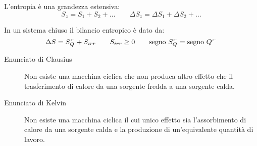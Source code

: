 L'entropia è una grandezza estensiva:
\[
    S_z = S_1 + S_2 + \ldots \qquad \Delta S_z = \Delta S_1 + \Delta S_2 + \ldots
\]

In un sistema chiuso il bilancio entropico è dato da:
\[
    \Delta S = S_Q^\shortleftarrow + S_{irr} \qquad S_{irr} \ge 0 \qquad \text{segno}~S_Q^\shortleftarrow = \text{segno}~Q^\shortleftarrow
\]

\begin{description}
    \item[Enunciato di Clausius]Non esiste una macchina ciclica che non produca altro effetto che il trasferimento di calore da una sorgente fredda a una sorgente calda.

\item[Enunciato di Kelvin]
Non esiste una macchina ciclica il cui unico effetto sia l'assorbimento di calore da una sorgente calda e la produzione di un'equivalente quantità di lavoro.
\end{description}
